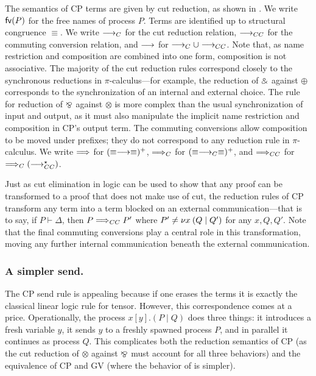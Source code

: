 \documentclass[oribibl,orivec,envcountsame]{llncs}
\begin{document}
The semantics of CP terms are given by cut reduction, as shown in .  We write
$\mathsf{fv}(P)$ for the free names of process $P$.  Terms are identified up to structural congruence
$\equiv$. We write $\longrightarrow_C$ for the cut reduction relation, $\longrightarrow_{CC}$ for the commuting conversion
relation, and $\longrightarrow$ for $\longrightarrow_C \cup \longrightarrow_{CC}$. Note that, as name restriction and composition are
combined into one form, composition is not associative. The majority of the cut reduction rules
correspond closely to the synchronous reductions in $\pi$-calculus---for example, the reduction of
$\mathbin\binampersand$ against $\oplus$ corresponds to the synchronization of an internal and external choice.  The
rule for reduction of $\mathbin\bindnasrepma$ against $\otimes$ is more complex than the usual synchronization of
input and output, as it must also manipulate the implicit name restriction and composition in CP's
output term. The commuting conversions allow composition to be moved under prefixes; they do not
correspond to any reduction rule in $\pi$-calculus. We write $\Longrightarrow$ for $(\equiv\longrightarrow\equiv)^+$,
$\Longrightarrow_C$ for $(\equiv\longrightarrow_C\equiv)^+$, and $\Longrightarrow_{CC}$ for $\Longrightarrow_C(\longrightarrow_{CC}^\star)$.

Just as cut elimination in logic can be used to show that any proof can be transformed to a proof
that does not make use of cut, the reduction rules of CP transform any term into a term blocked on
an external communication---that is to say, if $P \vdash \Delta$, then $P \Longrightarrow_{CC} P'$ where $P'
\not= \nu x \: (Q \mid Q')$ for any $x,Q,Q'$. Note that the final commuting conversions play a central
role in this transformation, moving any further internal communication beneath the external
communication.

\subsubsection{A simpler send.}

The CP send rule is appealing because if one erases the terms it is exactly the classical linear
logic rule for tensor. However, this correspondence comes at a price. Operationally, the process
$x[y].(P \mid Q)$ does three things: it introduces a fresh variable $y$, it sends $y$ to a freshly
spawned process $P$, and in parallel it continues as process $Q$.  This complicates both the
reduction semantics of CP (as the cut reduction of $\otimes$ against $\mathbin\bindnasrepma$ must account for all
three behaviors) and the equivalence of CP and GV (where the behavior of  is simpler).
\end{document}
